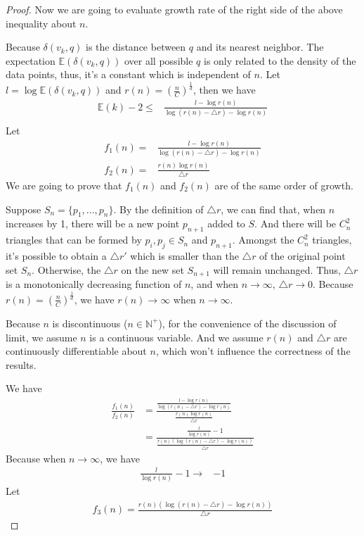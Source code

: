 \documentclass{vldb}
\begin{document}
\begin{appendix}
\begin{proof}
Now we are going to evaluate growth rate of the right side of the above inequality about $n$. 

Because $\delta(v_k, q)$ is the distance between $q$ and its nearest neighbor. The expectation $\mathbb{E}(\delta(v_k, q))$ over all possible $q$ is only related to the density of the data points, thus, it's a constant which is independent of $n$. Let $l = \log \mathbb{E}(\delta(v_k, q))$ and $r(n) = (\frac{n}{C})^\frac{1}{d}$, then we have
\begin{align*}
\mathbb{E}(k) - 2 \le & \frac{l - \log r(n)}{\log (r(n) - \triangle{r}) - \log r(n)}\\
\end{align*}
Let
\begin{align*}
f_1(n) = & \frac{l - \log r(n)}{\log (r(n) - \triangle{r}) - \log r(n)}\\
f_2(n) = & \frac{r(n)\log r(n)}{\triangle{r}}
\end{align*}
We are going to prove that $f_1(n)$ and $f_2(n)$ are of the same order of growth. 

Suppose $S_n=\{p_1, ... ,p_n\}$. By the definition of $\triangle{r}$, we can find that, when $n$ increases by 1, there will be a new point $p_{n+1}$ added to $S$. And there will be $C_n^2$ triangles that can be formed by $p_i, p_j \in S_n$ and $p_{n+1}$. Amongst the $C_n^2$ triangles, it's possible to obtain a $\triangle{r}'$ which is smaller than the $\triangle{r}$ of the original point set $S_n$. Otherwise, the $\triangle{r}$ on the new set $S_{n+1}$ will remain unchanged. Thus, $\triangle{r}$ is a monotonically decreasing function of $n$, and when $n \rightarrow \infty$, $\triangle{r} \rightarrow 0$. Because $r(n) = (\frac{n}{C})^\frac{1}{d}$, we have $r(n) \rightarrow \infty$ when $n \rightarrow \infty$.

Because $n$ is discontinuous ($n \in \mathbb{N}^+$), for the convenience of the discussion of limit, we assume $n$ is a continuous variable. And we assume $r(n)$ and $\triangle{r}$ are continuously differentiable about $n$, which won't influence the correctness of the results. 

We have
\begin{align*}
\frac{f_1(n)}{f_2(n)} &= \frac{\frac{l - \log r(n)}{\log (r(n) - \triangle{r}) - \log r(n)}}{\frac{r(n)\log r(n)}{\triangle{r}}}\\
			      &= \frac{\frac{l}{\log r(n)}-1}{\frac{r(n)(\log (r(n) - \triangle{r}) - \log r(n))}{\triangle{r}}}
\end{align*}
Because when $n\rightarrow \infty$, we have 
\begin{align*}
\frac{l}{\log r(n)}-1 \rightarrow & -1 
\end{align*}
Let 
\begin{align*}
f_3(n) = \frac{r(n)(\log (r(n) - \triangle{r}) - \log r(n))}{\triangle{r}}
\end{align*}


\end{proof}
\end{appendix}
\end{document}
